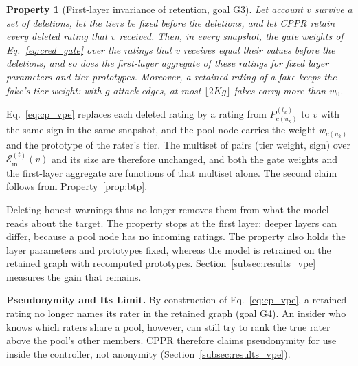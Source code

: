 \documentclass[lettersize,journal]{IEEEtran}
\newtheorem{property}{Property}
\begin{document}
\begin{property}[First-layer invariance of retention, goal G3]
\label{prop:invariance}
Let account $v$ survive a set of deletions, let the tiers be fixed before the deletions, and let CPPR retain every deleted rating that $v$ received.
Then, in every snapshot, the gate weights of Eq.~\eqref{eq:cred_gate} over the ratings that $v$ receives equal their values before the deletions, and so does the first-layer aggregate of these ratings for fixed layer parameters and tier prototypes.
Moreover, a retained rating of a fake keeps the fake's tier weight: with $g$ attack edges, at most $\lfloor 2Kg \rfloor$ fakes carry more than $w_0$.
\end{property}
\begin{IEEEproof}
Eq.~\eqref{eq:cp_vpe} replaces each deleted rating by a rating from $P^{(t_k)}_{c(u_k)}$ to $v$ with the same sign in the same snapshot, and the pool node carries the weight $w_{c(u_k)}$ and the prototype of the rater's tier.
The multiset of pairs (tier weight, sign) over $\mathcal{E}^{(t)}_{\mathrm{in}}(v)$ and its size are therefore unchanged, and both the gate weights and the first-layer aggregate are functions of that multiset alone.
The second claim follows from Property~\ref{prop:btp}.
\end{IEEEproof}

Deleting honest warnings thus no longer removes them from what the model reads about the target.
The property stops at the first layer: deeper layers can differ, because a pool node has no incoming ratings. The property also holds the layer parameters and prototypes fixed, whereas the model is retrained on the retained graph with recomputed prototypes.
Section~\ref{subsec:results_vpe} measures the gain that remains.

\smallskip\noindent\textbf{Pseudonymity and Its Limit.}
By construction of Eq.~\eqref{eq:cp_vpe}, a retained rating no longer names its rater in the retained graph (goal G4). An insider who knows which raters share a pool, however, can still try to rank the true rater above the pool's other members.
CPPR therefore claims pseudonymity for use inside the controller, not anonymity (Section~\ref{subsec:results_vpe}).
\end{document}
